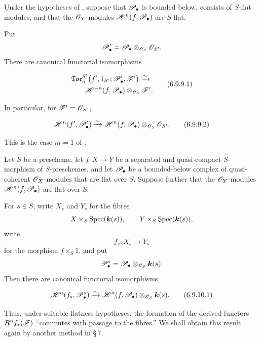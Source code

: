 \begin{corollary}[6.9.9]
\label{III.6.9.9}
Under the hypotheses of , suppose that
$\mathscr{P}_\bullet$ is bounded below, consists of $S$-flat modules,
and that the $\mathscr{O}_Y$-modules
$\mathscr{H}^n(f,\mathscr{P}_\bullet)$ are $S$-flat.


Put
\[
  \mathscr{P}_\bullet'
  =
  \mathscr{P}_\bullet\otimes_{\mathscr{O}_S}\mathscr{O}_{S'}.
\]
There are canonical functorial isomorphisms
\begin{env}[6.9.9.1]
\label{III.6.9.9.1}
\[
\begin{split}
  &
  \mathfrak{Tor}_n^{S'}
  \bigl(
    f',1_{S'};\mathscr{P}_\bullet',\mathscr{F}'
  \bigr)
  \xrightarrow{\sim}
  \\
  &\qquad
  \mathscr{H}^{-n}(f,\mathscr{P}_\bullet)
  \otimes_{\mathscr{O}_S}\mathscr{F}'.
\end{split}
  \tag{6.9.9.1}\label{III.6.9.9.1.eq}
\]
\end{env}
In particular, for $\mathscr{F}'=\mathscr{O}_{S'}$,
\begin{env}[6.9.9.2]
\label{III.6.9.9.2}
\[
  \mathscr{H}^n(f',\mathscr{P}_\bullet')
  \xrightarrow{\sim}
  \mathscr{H}^n(f,\mathscr{P}_\bullet)
  \otimes_{\mathscr{O}_S}\mathscr{O}_{S'}.
  \tag{6.9.9.2}\label{III.6.9.9.2.eq}
\]
\end{env}
This is the case $m=1$ of .
\end{corollary}

\begin{corollary}[6.9.10]
\label{III.6.9.10}
Let $S$ be a prescheme, let $f:X\to Y$ be a separated and
quasi-compact $S$-morphism of $S$-preschemes, and let
$\mathscr{P}_\bullet$ be a bounded-below complex of quasi-coherent
$\mathscr{O}_X$-modules that are flat over $S$.  Suppose further that
the $\mathscr{O}_Y$-modules $\mathscr{H}^n(f,\mathscr{P}_\bullet)$ are flat over
$S$.

For $s\in S$, write $X_s$ and $Y_s$ for the fibres
\[
  X\times_S\operatorname{Spec}(\boldsymbol{k}(s)),
  \qquad
  Y\times_S\operatorname{Spec}(\boldsymbol{k}(s)),
\]
write
\[
  f_s:X_s\longrightarrow Y_s
\]
for the morphism $f\times_S1$, and put
\[
  \mathscr{P}_\bullet^s
  =
  \mathscr{P}_\bullet\otimes_{\mathscr{O}_S}\boldsymbol{k}(s).
\]
Then there are canonical functorial isomorphisms
\begin{env}[6.9.10.1]
\label{III.6.9.10.1}
\[
  \mathscr{H}^n(f_s,\mathscr{P}_\bullet^s)
  \xrightarrow{\sim}
  \mathscr{H}^n(f,\mathscr{P}_\bullet)
  \otimes_{\mathscr{O}_S}\boldsymbol{k}(s).
  \tag{6.9.10.1}\label{III.6.9.10.1.eq}
\]
\end{env}
\end{corollary}

Thus, under suitable flatness hypotheses, the formation of the
derived functors $R^nf_*(\mathscr{F})$ ``commutes with passage to the
fibres.''  We shall obtain this result again by another method in
\S\,7.

